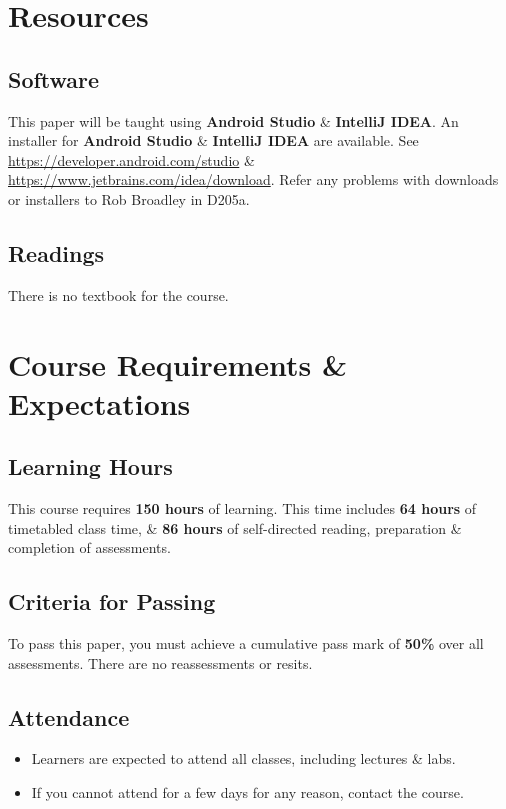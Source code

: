\documentclass{article}
\begin{document}
\section*{Resources}

\subsection*{Software}
This paper will be taught using \textbf{Android Studio} \& \textbf{IntelliJ IDEA}. An installer for \textbf{Android Studio} \& \textbf{IntelliJ IDEA} are available. See \href{https://developer.android.com/studio/}{https://developer.android.com/studio} \& \href{https://www.jetbrains.com/idea/download/}{https://www.jetbrains.com/idea/download}. Refer any problems with downloads or installers to Rob Broadley in D205a.

\subsection*{Readings}
There is no textbook for the course.

\section*{Course Requirements \& Expectations}

\subsection*{Learning Hours}
This course requires \textbf{150 hours} of learning. This time includes \textbf{64 hours} of timetabled class time, \& \textbf{86 hours} of self-directed reading, preparation \& completion of assessments.

\subsection*{Criteria for Passing}
To pass this paper, you must achieve a cumulative pass mark of \textbf{50\%} over all assessments. There are no reassessments or resits.

\subsection*{Attendance}
\begin{itemize}
	\item Learners are expected to attend all classes, including lectures \& labs.
	\item If you cannot attend for a few days for any reason, contact the course.
\end{itemize}
\end{document}
